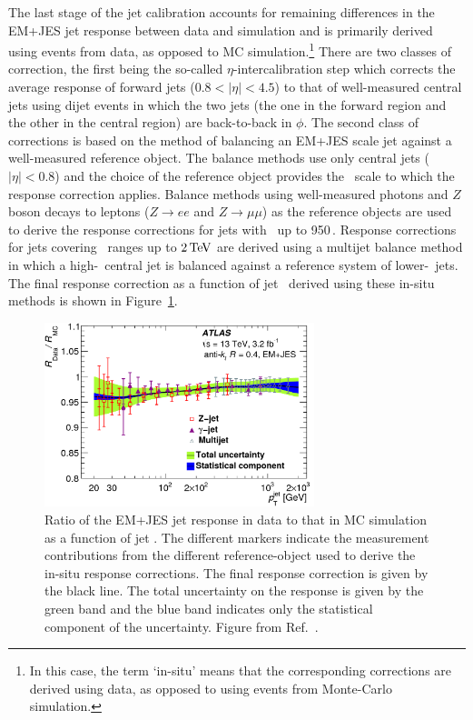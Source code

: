 The last stage of the jet calibration accounts for remaining differences in the EM+JES jet response between data and simulation
and is primarily derived using events from data, as opposed to MC simulation.\footnote{In this case, the term `in-situ' means
that the corresponding corrections are derived using data, as opposed to using events from Monte-Carlo simulation.}
There are two classes of correction, the first being the so-called $\eta$-intercalibration step which corrects the
average response of forward jets ($0.8 < \lvert \eta \rvert < 4.5$) to that of well-measured central jets using dijet events
in which the two jets (the one in the forward region and the other in the central region) are back-to-back in $\phi$.
The second class of corrections is based on the method of balancing an EM+JES scale jet against a well-measured reference object.
The balance methods use only central jets ($\lvert \eta \rvert < 0.8$) and the choice of the reference object
provides the \pT~scale to which the response correction applies.
Balance methods using well-measured photons and $Z$ boson decays to leptons ($Z \rightarrow ee$ and $Z\rightarrow \mu \mu$)
as the reference objects are used to derive the response corrections for jets with \pT~up to 950\,\GeV.
Response corrections for jets covering \pT~ranges up to $2\,\text{Te\kern -0.1em V}$ are derived using a multijet balance method
in which a high-\pT~central jet is balanced against a reference system of lower-\pT~jets.
The final response correction as a function of jet \pT~derived using these in-situ methods is shown in Figure~\ref{fig:jet_corr_insitu}.

\begin{figure}[!htb]
    \begin{center}
        \includegraphics[width=0.7\textwidth]{figures/chapter3/jets/jet_corr_insitu}
        \caption{
            Ratio of the EM+JES jet response in data to that in MC simulation as a function of jet \pT.
            The different markers indicate the measurement contributions from the different
            reference-object used to derive the in-situ response corrections.
            The final response correction is given by the black line.
            The total uncertainty on the response is given by the green band and the blue band
            indicates only the statistical component of the uncertainty.
            Figure from Ref.~\cite{Aaboud:2017jcu}.
        }
        \label{fig:jet_corr_insitu}
    \end{center}
\end{figure}
\FloatBarrier
